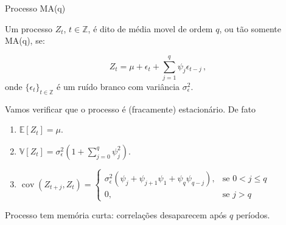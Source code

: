 \documentclass[11pt]{beamer}
\newenvironment{halfwideitemize}{\itemize\addtolength{\itemsep}{0.5em}}{\enditemize}
\begin{document}
\begin{frame}{Processo  MA(q)}
	\begin{halfwideitemize}
			\item Um processo $Z_t$, $t \in \mathbb{Z}$, é dito de média movel de ordem $q$, ou tão somente MA(q), se:
			
			$$Z_t = \mu + \epsilon_t + \sum_{j=1}^{q} \psi_j \epsilon_{t-j} \, ,$$
			onde $\{\epsilon_t\}_{t \in \mathbb{Z}}$ é um ruído branco com variância $\sigma^2_\epsilon$.
			\item Vamos verificar que o processo é (fracamente) estacionário. De fato
			\begin{enumerate}
				\item 			$\mathbb{E}[Z_t] = \mu $.
				\item $\mathbb{V}[Z_t] = \sigma^2_\epsilon(1+ \sum_{j=0}^q\psi^2_j)$.
				\item $\operatorname{cov}( Z_{t+j}, Z_t) = \begin{cases}
					\sigma^2_\epsilon (\psi_{j} + \psi_{j+1}\psi_1 + \psi_q \psi_{q-j}), & \text{se } 0 < j  \leq q \\
					0,& \text{se } j  > q
				\end{cases}$
			\end{enumerate}
			\item Processo tem memória curta: correlações desaparecem após $q$ períodos.
	\end{halfwideitemize}
\end{frame}
\end{document}
